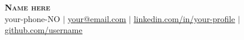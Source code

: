\begin{center}
  \textbf{\Huge{\scshape{Name here}}} \\ \vspace{1pt}
  \small your-phone-NO $|$ \href{mailto:your@email.com}{\underline{your@email.com}} $|$
  \href{https://linkedin.com/in/your-profile}{\underline{linkedin.com/in/your-profile}} $|$
  \href{https://github.com/username}{\underline{github.com/username}}
\end{center}